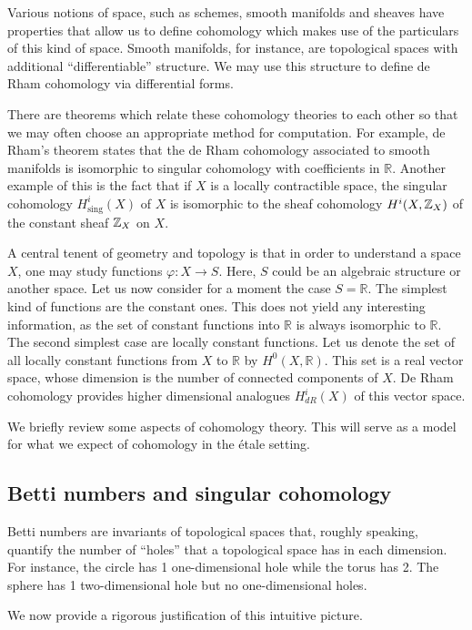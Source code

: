 Various notions of space, such as schemes, smooth manifolds and sheaves have properties that allow us to define cohomology which makes use of the particulars of this kind of space. Smooth manifolds, for instance, are topological spaces with additional “differentiable” structure.  We may use this structure to define de Rham cohomology via differential forms.

There are theorems which relate these cohomology theories to each other so that we may often choose an appropriate method for computation. For example, de Rham's theorem states that the de Rham cohomology associated to smooth manifolds is isomorphic to singular cohomology with coefficients in $\mathbb{R}$. Another example of this is the fact that if $X$ is a locally contractible space, the singular cohomology $H_{\text{sing}}^i(X)$ of $X$ is isomorphic to the sheaf cohomology $H^i(X, \mathbb{Z}_X)$ of the constant sheaf $\mathbb{Z}_X$ on $X$.

A central tenent of geometry and topology is that in order to understand a space $X$, one may study functions $\varphi: X \to S$. Here, $S$ could be an algebraic structure or another space. Let us now consider for a moment the case $S=\mathbb{R}$. The simplest kind of functions are the constant ones. This does not yield any interesting information, as the set of constant functions into $\mathbb{R}$ is always isomorphic to $\mathbb{R}$. The second simplest case are locally constant functions. Let us denote the set of all locally constant functions from $X$ to $\mathbb{R}$ by $H^0(X,\mathbb{R})$. This set is a real vector space, whose dimension is the number of connected components of $X$. De Rham cohomology provides higher dimensional analogues $H^i_{dR}(X)$ of this vector space.

We briefly review some aspects of cohomology theory. This will serve as a model for what we expect of cohomology in the \'etale setting.

\subsection{Betti numbers and singular cohomology}
Betti numbers are invariants of topological spaces that, roughly speaking, quantify the number of ``holes'' that a topological space has in each dimension. For instance, the circle has 1 one-dimensional hole while the torus has 2. The sphere has 1 two-dimensional hole but no one-dimensional holes. 

We now provide a rigorous justification of this intuitive picture.

